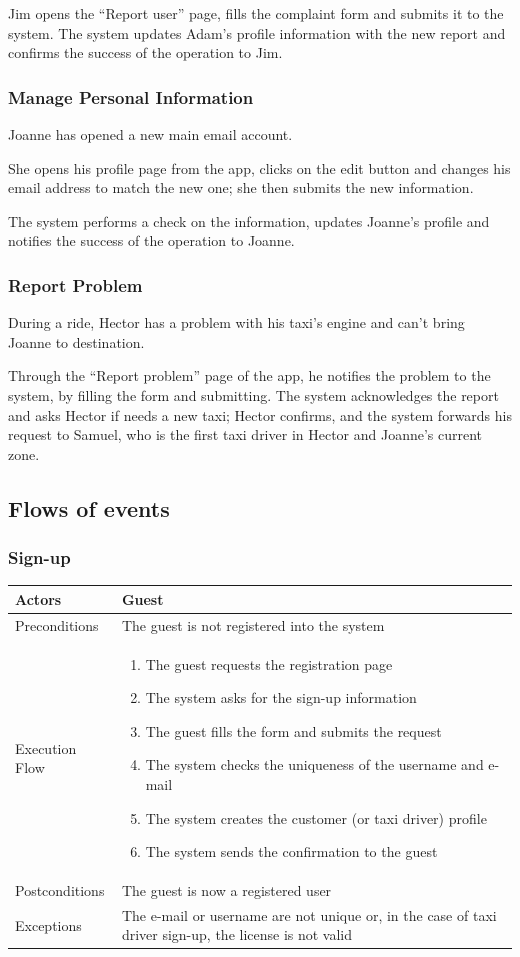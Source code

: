 \documentclass[english]{article}
\providecommand{\tabularnewline}{\\}
\begin{document}
Jim opens the ``Report user'' page, fills the complaint form and
submits it to the system. The system updates Adam's profile information
with the new report and confirms the success of the operation to Jim.


\subsubsection{Manage Personal Information}

Joanne has opened a new main email account. 

She opens his profile page from the app, clicks on the edit button
and changes his email address to match the new one; she then submits
the new information. 

The system performs a check on the information, updates Joanne's profile
and notifies the success of the operation to Joanne.


\subsubsection{Report Problem}

During a ride, Hector has a problem with his taxi's engine and can't
bring Joanne to destination. 

Through the ``Report problem'' page of the app, he notifies the
problem to the system, by filling the form and submitting. The system
acknowledges the report and asks Hector if needs a new taxi; Hector
confirms, and the system forwards his request to Samuel, who is the
first taxi driver in Hector and Joanne's current zone. 


\subsection{Flows of events}


\subsubsection{Sign-up}

\begin{tabular}{lp{8cm}}
\hline 
Actors  & Guest \tabularnewline
\hline 
Preconditions  & The guest is not registered into the system \tabularnewline
\hline 
Execution Flow  & \begin{enumerate}
\item The guest requests the registration page 
\item The system asks for the sign-up information 
\item The guest fills the form and submits the request 
\item The system checks the uniqueness of the username and e-mail 
\item The system creates the customer (or taxi driver) profile 
\item The system sends the confirmation to the guest \end{enumerate}
\tabularnewline
\hline 
Postconditions  & The guest is now a registered user \tabularnewline
\hline 
Exceptions  & The e-mail or username are not unique or, in the case of taxi driver
sign-up, the license is not valid \tabularnewline
\end{tabular}
\end{document}
